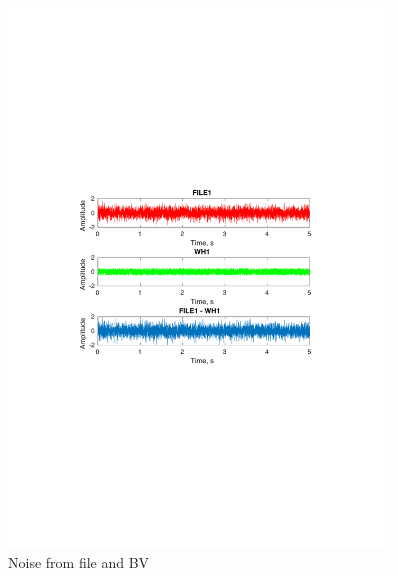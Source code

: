 \documentclass[12pt,a4paper,UKenglish]{article}
\begin{document}
\begin{figure} [H]
  \centering 
  \includegraphics[width=0.9\textwidth]{img/5c.pdf} 
  \caption{Noise from file and BV}
  \label{white3} 
\end{figure}
\end{document}
